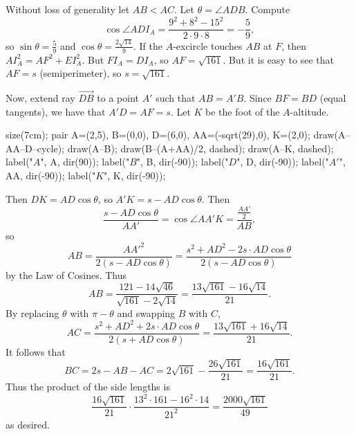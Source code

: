 Without loss of generality let $AB<AC$. Let $\theta=\angle{ADB}$. Compute
	\[
		\cos\angle{ADI_A}=\frac{9^2+8^2-15^2}{2\cdot9\cdot8}=-\frac{5}{9},
	\]
	so $\sin\theta=\frac{5}{9}$ and $\cos\theta=\frac{2\sqrt{14}}{9}$. If the $A$-excircle touches $AB$ at $F$, then $AI_A^2=AF^2+EI_A^2$. But $FI_A=DI_A$, so $AF=\sqrt{161}$. But it is easy to see that $AF=s$ (semiperimeter), so $s=\sqrt{161}$.
	
	Now, extend ray $\overrightarrow{DB}$ to a point $A'$ such that $AB=A'B$. Since $BF=BD$ (equal tangents), we have that $A'D=AF=s$. Let $K$ be the foot of the $A$-altitude.
	\begin{center}
		\begin{asy}
			size(7cm);
			pair A=(2,5), B=(0,0), D=(6,0), AA=(-sqrt(29),0), K=(2,0);
			draw(A--AA--D--cycle); draw(A--B); draw(B--(A+AA)/2, dashed); draw(A--K, dashed);
			label("$A$", A, dir(90)); label("$B$", B, dir(-90)); label("$D$", D, dir(-90)); label("$A'$", AA, dir(-90)); label("$K$", K, dir(-90));
		\end{asy}
	\end{center}
	
	
	Then $DK=AD\cos\theta$, so $A'K=s-AD\cos\theta$. Then
	\[
		\frac{s-AD\cos\theta}{AA'}=\cos\angle{AA'K}=\frac{\frac{AA'}{2}}{AB},
	\]
	so
	\[
		AB=\frac{AA'^2}{2(s-AD\cos\theta)}=\frac{s^2+AD^2-2s\cdot AD\cos\theta}{2(s-AD\cos\theta)}
	\]
	by the Law of Cosines. Thus
	\[
		AB=\frac{121-14\sqrt{46}}{\sqrt{161}-2\sqrt{14}}=\frac{13\sqrt{161}-16\sqrt{14}}{21}.
	\]
	By replacing $\theta$ with $\pi-\theta$ and swapping $B$ with $C$,
	\[
		AC=\frac{s^2+AD^2+2s\cdot AD\cos\theta}{2(s+AD\cos\theta)}=\frac{13\sqrt{161}+16\sqrt{14}}{21}.
	\]
	It follows that
	\[
		BC=2s-AB-AC=2\sqrt{161}-\frac{26\sqrt{161}}{21}=\frac{16\sqrt{161}}{21}.
	\]
	Thus the product of the side lengths is
	\[
		\frac{16\sqrt{161}}{21}\cdot\frac{13^2\cdot161-16^2\cdot14}{21^2}=\frac{2000\sqrt{161}}{49}
	\]
	as desired.
	